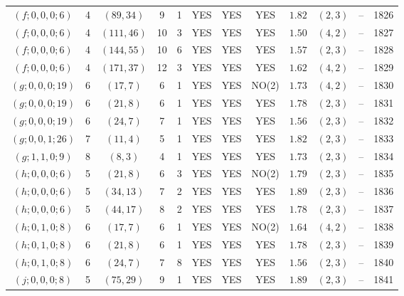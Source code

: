 \begin{longtable}{|c|c|c|c|c|c|c|c|c|c|c|c|}
$(f;0,0,0;6)$ & 4 & $(89,34)$ & 9 & 1 & YES & YES & YES & $1.82$ & $(2,3)$ & -- & 1826\\
$(f;0,0,0;6)$ & 4 & $(111,46)$ & 10 & 3 & YES & YES & YES & $1.50$ & $(4,2)$ & -- & 1827\\
$(f;0,0,0;6)$ & 4 & $(144,55)$ & 10 & 6 & YES & YES & YES & $1.57$ & $(2,3)$ & -- & 1828\\
$(f;0,0,0;6)$ & 4 & $(171,37)$ & 12 & 3 & YES & YES & YES & $1.62$ & $(4,2)$ & -- & 1829\\
$(g;0,0,0;19)$ & 6 & $(17,7)$ & 6 & 1 & YES & YES & NO(2) & $1.73$ & $(4,2)$ & -- & 1830\\
$(g;0,0,0;19)$ & 6 & $(21,8)$ & 6 & 1 & YES & YES & YES & $1.78$ & $(2,3)$ & -- & 1831\\
$(g;0,0,0;19)$ & 6 & $(24,7)$ & 7 & 1 & YES & YES & YES & $1.56$ & $(2,3)$ & -- & 1832\\
$(g;0,0,1;26)$ & 7 & $(11,4)$ & 5 & 1 & YES & YES & YES & $1.82$ & $(2,3)$ & -- & 1833\\
$(g;1,1,0;9)$ & 8 & $(8,3)$ & 4 & 1 & YES & YES & YES & $1.73$ & $(2,3)$ & -- & 1834\\
$(h;0,0,0;6)$ & 5 & $(21,8)$ & 6 & 3 & YES & YES & NO(2) & $1.79$ & $(2,3)$ & -- & 1835\\
$(h;0,0,0;6)$ & 5 & $(34,13)$ & 7 & 2 & YES & YES & YES & $1.89$ & $(2,3)$ & -- & 1836\\
$(h;0,0,0;6)$ & 5 & $(44,17)$ & 8 & 2 & YES & YES & YES & $1.78$ & $(2,3)$ & -- & 1837\\
$(h;0,1,0;8)$ & 6 & $(17,7)$ & 6 & 1 & YES & YES & NO(2) & $1.64$ & $(4,2)$ & -- & 1838\\
$(h;0,1,0;8)$ & 6 & $(21,8)$ & 6 & 1 & YES & YES & YES & $1.78$ & $(2,3)$ & -- & 1839\\
$(h;0,1,0;8)$ & 6 & $(24,7)$ & 7 & 8 & YES & YES & YES & $1.56$ & $(2,3)$ & -- & 1840\\
$(j;0,0,0;8)$ & 5 & $(75,29)$ & 9 & 1 & YES & YES & YES & $1.89$ & $(2,3)$ & -- & 1841
\end{longtable}
